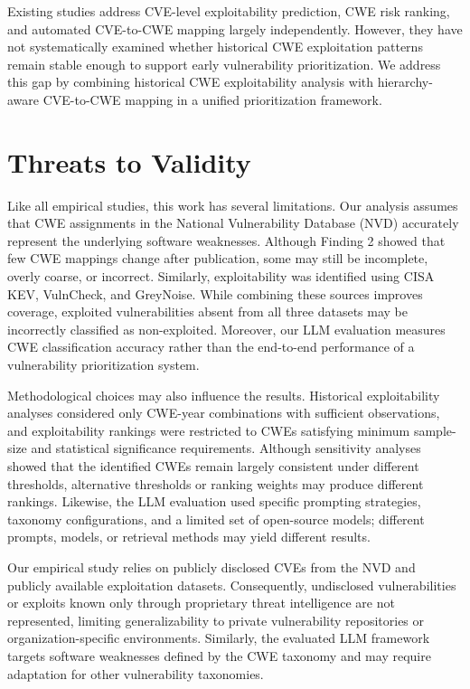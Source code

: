 \documentclass[conference,compsoc]{IEEEtran}
\begin{document}
Existing studies address CVE-level exploitability
prediction, CWE risk ranking, and automated
CVE-to-CWE mapping largely independently.
However, they have not systematically examined
whether historical CWE exploitation patterns
remain stable enough to support early vulnerability
prioritization. We address this gap by combining
historical CWE exploitability analysis with
hierarchy-aware CVE-to-CWE mapping in a unified
prioritization framework.

\section{Threats to Validity}

Like all empirical studies, this work has several limitations. Our analysis assumes that CWE assignments in the National Vulnerability Database (NVD) accurately represent the underlying software weaknesses. Although Finding 2 showed that few CWE mappings change after publication, some may still be incomplete, overly coarse, or incorrect. Similarly, exploitability was identified using CISA KEV, VulnCheck, and GreyNoise. While combining these sources improves coverage, exploited vulnerabilities absent from all three datasets may be incorrectly classified as non-exploited. Moreover, our LLM evaluation measures CWE classification accuracy rather than the end-to-end performance of a vulnerability prioritization system.

Methodological choices may also influence the results. Historical exploitability analyses considered only CWE-year combinations with sufficient observations, and exploitability rankings were restricted to CWEs satisfying minimum sample-size and statistical significance requirements. Although sensitivity analyses showed that the identified CWEs remain largely consistent under different thresholds, alternative thresholds or ranking weights may produce different rankings. Likewise, the LLM evaluation used specific prompting strategies, taxonomy configurations, and a limited set of open-source models; different prompts, models, or retrieval methods may yield different results.

Our empirical study relies on publicly disclosed CVEs from the NVD and publicly available exploitation datasets. Consequently, undisclosed vulnerabilities or exploits known only through proprietary threat intelligence are not represented, limiting generalizability to private vulnerability repositories or organization-specific environments. Similarly, the evaluated LLM framework targets software weaknesses defined by the CWE taxonomy and may require adaptation for other vulnerability taxonomies.
\end{document}
